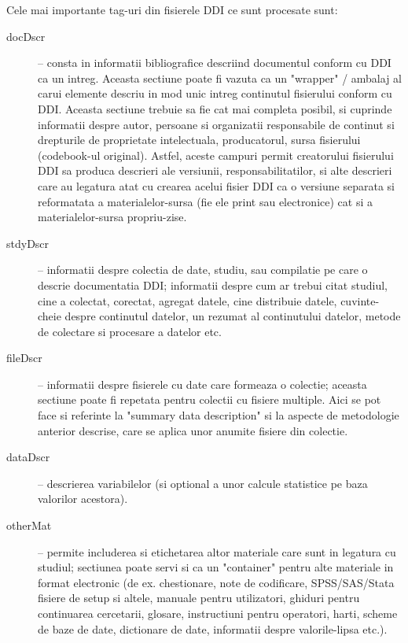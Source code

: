 Cele mai importante tag-uri din fisierele DDI ce sunt procesate sunt:
\begin{description}
\item [docDscr] --
consta in informatii bibliografice descriind documentul conform cu DDI ca un intreg. 
Aceasta sectiune poate fi vazuta ca un "wrapper" / ambalaj al carui elemente descriu in mod unic intreg continutul fisierului conform cu DDI. 
Aceasta sectiune trebuie sa fie cat mai completa posibil, si cuprinde informatii despre 
autor, persoane si organizatii responsabile de continut si drepturile de proprietate intelectuala, producatorul, sursa fisierului (codebook-ul original). 
Astfel, aceste campuri permit creatorului fisierului DDI sa produca descrieri ale versiunii, responsabilitatilor, 
si alte descrieri care au legatura atat cu crearea acelui fisier DDI ca o versiune separata si reformatata a materialelor-sursa (fie ele print sau electronice) 
cat si a materialelor-sursa propriu-zise.

\item [stdyDscr] -- 
informatii despre colectia de date, studiu, sau compilatie pe care o descrie documentatia DDI; 
informatii despre cum ar trebui citat studiul, cine a colectat, corectat, agregat datele, cine distribuie datele, cuvinte-cheie despre continutul datelor, un rezumat al continutului datelor, metode de colectare si procesare a datelor etc.

\item [fileDscr] --
informatii despre fisierele cu date care formeaza o colectie; aceasta sectiune poate fi repetata pentru colectii cu fisiere multiple. 
Aici se pot face si referinte la "summary data description" si la aspecte de metodologie anterior descrise, care se aplica unor anumite fisiere din colectie.

\item [dataDscr] --
descrierea variabilelor (si optional a unor calcule statistice pe baza valorilor acestora).

\item [otherMat] -- 
permite includerea si etichetarea altor materiale care sunt in legatura cu studiul;
sectiunea poate servi si ca un "container" pentru alte materiale in format electronic (de ex. chestionare, note de codificare, SPSS/SAS/Stata fisiere de setup si altele, manuale pentru utilizatori, ghiduri pentru continuarea cercetarii, glosare, instructiuni pentru operatori, harti, scheme de baze de date, dictionare de date, informatii despre valorile-lipsa etc.).

\end{description}

